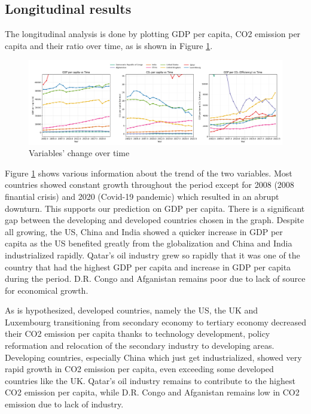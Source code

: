 \documentclass[a4paper]{article}
\begin{document}
\subsection{Longitudinal results} %

The longitudinal analysis is done by plotting GDP per capita, CO2 emission per capita and their ratio over time, as is shown in Figure \ref{fig.vertical}.

\begin{figure}[ht!]
    \centering
    \caption{Variables' change over time}
    \label{fig.vertical}
    \includegraphics[width = \textwidth]{data/vertical(rescale).png}
\end{figure}

Figure \ref{fig.vertical} shows various information about the trend of the two variables. Most countries showed constant growth throughout the period except for 2008 (2008 finantial crisis) and 2020 (Covid-19 pandemic) which resulted in an abrupt downturn. This supports our prediction on GDP per capita. There is a significant gap between the developing and developed countries chosen in the graph. Despite all growing, the US, China and India showed a quicker increase in GDP per capita as the US benefited greatly from the globalization and China and India industrialized rapidly. Qatar's oil industry grew so rapidly that it was one of the country that had the highest GDP per capita and increase in GDP per capita during the period. D.R. Congo and Afganistan remains poor due to lack of source for economical growth.

As is hypothesized, developed countries, namely the US, the UK and Luxembourg transitioning from secondary economy to tertiary economy decreased their CO2 emission per capita thanks to technology development, policy reformation and relocation of the secondary industry to developing areas. Developing countries, especially China which just get industrialized, showed very rapid growth in CO2 emission per capita, even exceeding some developed countries like the UK. Qatar's oil industry remains to contribute to the highest CO2 emission per capita, while D.R. Congo and Afganistan remains low in CO2 emission due to lack of industry.
\end{document}

